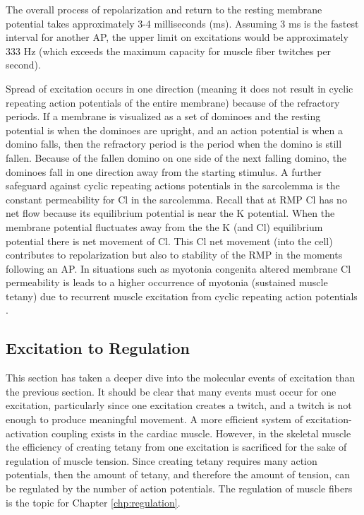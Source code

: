 The overall process of repolarization and return to the resting membrane potential takes approximately 3-4 milliseconds (ms). Assuming 3 ms is the fastest interval for another AP, the upper limit on excitations would be approximately 333 Hz (which exceeds the maximum capacity for muscle fiber twitches per second).

Spread of excitation occurs in one direction (meaning it does not result in cyclic repeating action potentials of the entire membrane) because of the refractory periods. If a membrane is visualized as a set of dominoes and the resting potential is when the dominoes are upright, and an action potential is when a domino falls, then the refractory period is the period when the domino is still fallen. Because of the fallen domino on one side of the next falling domino, the dominoes fall in one direction away from the starting stimulus. A further safeguard against cyclic repeating actions potentials in the sarcolemma is the constant permeability for Cl in the sarcolemma. Recall that at RMP Cl has no net flow because its equilibrium potential is near the K potential. When the membrane potential fluctuates away from the the K (and Cl) equilibrium potential there is net movement of Cl. This Cl net movement (into the cell) contributes to repolarization but also to stability of the RMP in the moments following an AP. In situations such as myotonia congenita altered membrane Cl permeability is leads to a higher occurrence of myotonia (sustained muscle tetany) due to recurrent muscle excitation from cyclic repeating action potentials \cite{adrian_action_1976}.

\subsection{Excitation to Regulation}

This section has taken a deeper dive into the molecular events of excitation than the previous section. It should be clear that many events must occur for one excitation, particularly since one excitation creates a twitch, and a twitch is not enough to produce meaningful movement. A more efficient system of excitation-activation coupling exists in the cardiac muscle. However, in the skeletal muscle the efficiency of creating tetany from one excitation is sacrificed for the sake of regulation of muscle tension. Since creating tetany requires many action potentials, then the amount of tetany, and therefore the amount of tension, can be regulated by the number of action potentials. The regulation of muscle fibers is the topic for Chapter \ref{chp:regulation}.


